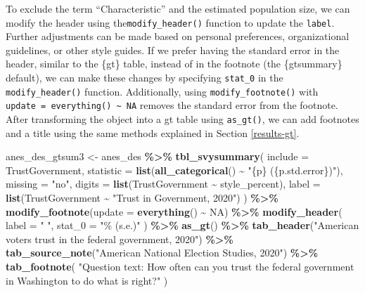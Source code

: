 \documentclass[
]{krantz}
\makeatletter
\newenvironment{Shaded}{\begin{snugshade}}{\end{snugshade}}
\newcommand{\AttributeTok}[1]{\textcolor[rgb]{0.27,0.27,0.27}{#1}}
\newcommand{\ConstantTok}[1]{\textcolor[rgb]{0.37,0.37,0.37}{#1}}
\newcommand{\FunctionTok}[1]{\textcolor[rgb]{0.27,0.27,0.27}{\textbf{#1}}}
\newcommand{\NormalTok}[1]{#1}
\newcommand{\OtherTok}[1]{\textcolor[rgb]{0.37,0.37,0.37}{#1}}
\newcommand{\SpecialCharTok}[1]{\textcolor[rgb]{0.43,0.43,0.43}{\textbf{#1}}}
\newcommand{\StringTok}[1]{\textcolor[rgb]{0.5,0.5,0.5}{#1}}
\newenvironment{kframe}{%
\medskip{}
\setlength{\fboxsep}{.8em}
 \def\at@end@of@kframe{}%
 \ifinner\ifhmode%
  \def\at@end@of@kframe{\end{minipage}}%
  \begin{minipage}{\columnwidth}%
 \fi\fi%
 \def\FrameCommand##1{\hskip\@totalleftmargin \hskip-\fboxsep
 \colorbox{shadecolor}{##1}\hskip-\fboxsep
     \hskip-\linewidth \hskip-\@totalleftmargin \hskip\columnwidth}%
 \MakeFramed {\advance\hsize-\width
   \@totalleftmargin\z@ \linewidth\hsize
   \@setminipage}}%
 {\par\unskip\endMakeFramed%
 \at@end@of@kframe}
\renewenvironment{Shaded}{\begin{kframe}}{\end{kframe}}
\makeatother
\begin{document}
To exclude the term ``Characteristic'' and the estimated population size, we can modify the header using the\texttt{modify\_header()} function to update the \texttt{label}. Further adjustments can be made based on personal preferences, organizational guidelines, or other style guides. If we prefer having the standard error in the header, similar to the \{gt\} table, instead of in the footnote (the \{gtsummary\} default), we can make these changes by specifying \texttt{stat\_0} in the \texttt{modify\_header()} function. Additionally, using \texttt{modify\_footnote()} with \texttt{update\ =\ everything()\ \textasciitilde{}\ NA} removes the standard error from the footnote. After transforming the object into a gt table using \texttt{as\_gt()}, we can add footnotes and a title using the same methods explained in Section \ref{results-gt}.

\begin{Shaded}
\begin{Highlighting}[]
\NormalTok{anes\_des\_gtsum3 }\OtherTok{\textless{}{-}}\NormalTok{ anes\_des }\SpecialCharTok{\%\textgreater{}\%}
  \FunctionTok{tbl\_svysummary}\NormalTok{(}
    \AttributeTok{include =}\NormalTok{ TrustGovernment,}
    \AttributeTok{statistic =} \FunctionTok{list}\NormalTok{(}\FunctionTok{all\_categorical}\NormalTok{() }\SpecialCharTok{\textasciitilde{}} \StringTok{"\{p\} (\{p.std.error\})"}\NormalTok{),}
    \AttributeTok{missing =} \StringTok{"no"}\NormalTok{,}
    \AttributeTok{digits =} \FunctionTok{list}\NormalTok{(TrustGovernment }\SpecialCharTok{\textasciitilde{}}\NormalTok{ style\_percent),}
    \AttributeTok{label =} \FunctionTok{list}\NormalTok{(TrustGovernment }\SpecialCharTok{\textasciitilde{}} \StringTok{"Trust in Government, 2020"}\NormalTok{)}
\NormalTok{  ) }\SpecialCharTok{\%\textgreater{}\%}
  \FunctionTok{modify\_footnote}\NormalTok{(}\AttributeTok{update =} \FunctionTok{everything}\NormalTok{() }\SpecialCharTok{\textasciitilde{}} \ConstantTok{NA}\NormalTok{) }\SpecialCharTok{\%\textgreater{}\%}
  \FunctionTok{modify\_header}\NormalTok{(}
    \AttributeTok{label =} \StringTok{" "}\NormalTok{,}
    \AttributeTok{stat\_0 =} \StringTok{"\% (s.e.)"}
\NormalTok{  ) }\SpecialCharTok{\%\textgreater{}\%}
  \FunctionTok{as\_gt}\NormalTok{() }\SpecialCharTok{\%\textgreater{}\%}
  \FunctionTok{tab\_header}\NormalTok{(}\StringTok{"American voter\textquotesingle{}s trust}
\StringTok{             in the federal government, 2020"}\NormalTok{) }\SpecialCharTok{\%\textgreater{}\%}
  \FunctionTok{tab\_source\_note}\NormalTok{(}\StringTok{"American National Election Studies, 2020"}\NormalTok{) }\SpecialCharTok{\%\textgreater{}\%}
  \FunctionTok{tab\_footnote}\NormalTok{(}
    \StringTok{"Question text: How often can you trust}
\StringTok{    the federal government in Washington}
\StringTok{    to do what is right?"}
\NormalTok{  )}
\end{Highlighting}
\end{Shaded}
\end{document}
